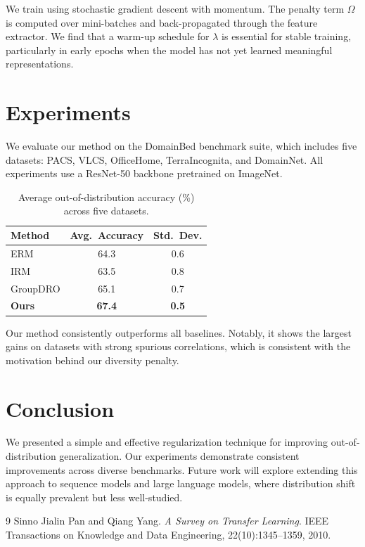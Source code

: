 \documentclass[12pt]{article}
\begin{document}
We train using stochastic gradient descent with momentum. The penalty term
$\Omega$ is computed over mini-batches and back-propagated through the feature
extractor. We find that a warm-up schedule for $\lambda$ is essential for
stable training, particularly in early epochs when the model has not yet
learned meaningful representations.

\section{Experiments}

We evaluate our method on the DomainBed benchmark suite, which includes
five datasets: PACS, VLCS, OfficeHome, TerraIncognita, and DomainNet.
All experiments use a ResNet-50 backbone pretrained on ImageNet.

\begin{table}[h]
  \centering
  \caption{Average out-of-distribution accuracy (\%) across five datasets.}
  \begin{tabular}{lcc}
    \hline
    \textbf{Method}  & \textbf{Avg.\ Accuracy} & \textbf{Std.\ Dev.} \\
    \hline
    ERM              & 64.3                    & 0.6 \\
    IRM              & 63.5                    & 0.8 \\
    GroupDRO         & 65.1                    & 0.7 \\
    \textbf{Ours}    & \textbf{67.4}           & \textbf{0.5} \\
    \hline
  \end{tabular}
\end{table}

Our method consistently outperforms all baselines. Notably, it shows the
largest gains on datasets with strong spurious correlations, which is consistent
with the motivation behind our diversity penalty.

\section{Conclusion}

We presented a simple and effective regularization technique for improving
out-of-distribution generalization. Our experiments demonstrate consistent
improvements across diverse benchmarks. Future work will explore extending
this approach to sequence models and large language models, where distribution
shift is equally prevalent but less well-studied.


\begin{thebibliography}{9}
  Sinno Jialin Pan and Qiang Yang.
  \textit{A Survey on Transfer Learning}.
  IEEE Transactions on Knowledge and Data Engineering, 22(10):1345--1359, 2010.
\end{thebibliography}
\end{document}
